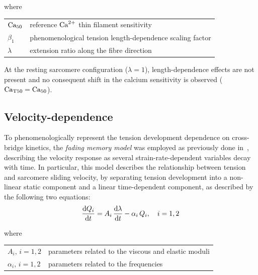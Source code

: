 \noindent
where

\vspace{0.2cm}
\begin{tabular}{ll}
    $\textrm{Ca}_{50}$   & reference $\textrm{Ca}^{2+}$ thin filament sensitivity \\
    $\beta_1$ & phenomenological tension length-dependence scaling factor \\
    $\lambda$ & extension ratio along the fibre direction
\end{tabular}

\vspace{0.3cm}\noindent
At the resting sarcomere configuration ($\lambda=1$), length-dependence effects are not present and no consequent shift in the calcium sensitivity is observed ($\textrm{Ca}_{\textrm{T}50}=\textrm{Ca}_{50}$).



%
%
%
\subsection{Velocity-dependence}
To phenomenologically represent the tension development dependence on cross-bridge kinetics, the \emph{fading memory model} was employed as previously done in~\cite{Niederer:2006}, describing the velocity response as several strain-rate-dependent variables decay with time. In particular, this model describes the relationship between tension and sarcomere sliding velocity, by separating tension development into a non-linear static component and a linear time-dependent component, as described by the following two equations:
%
\begin{equation}
    \dfrac{\mathrm{d}{Q_i}}{\mathrm{d}{t}} = A_i\,\dfrac{\mathrm{d}{\lambda}}{\mathrm{d}{t}}-\alpha_i\,Q_i,\quad i=1,2
\end{equation}

\noindent
where

\vspace{0.2cm}
\begin{tabular}{ll}
    $A_i,\,i=1,2$      & parameters related to the viscous and elastic moduli \\
    $\alpha_i,\,i=1,2$ & parameters related to the frequencies
\end{tabular}

